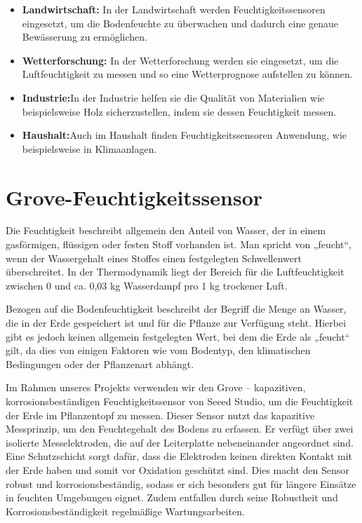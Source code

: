 		\begin{itemize}
			\item \textbf{Landwirtschaft:} In der Landwirtschaft werden Feuchtigkeitssensoren eingesetzt, um die Bodenfeuchte zu überwachen und 
			dadurch eine genaue Bewässerung zu ermöglichen.
			
			\item \textbf{Wetterforschung:}	In der Wetterforschung werden sie eingesetzt, um die Luftfeuchtigkeit zu messen und so eine Wetterprognose aufstellen zu können.  
			
			\item \textbf{Industrie:}In der Industrie helfen sie die Qualität von Materialien wie beispielsweise Holz sicherzustellen, indem sie dessen Feuchtigkeit messen.  
			
			\item \textbf{Haushalt:}Auch im Haushalt finden Feuchtigkeitssensoren Anwendung, wie beispielsweise in Klimaanlagen. 
		\end{itemize}
		
		\vspace{1\baselineskip}
		
		
	\section{Grove-Feuchtigkeitssensor}
		Die Feuchtigkeit beschreibt allgemein den Anteil von Wasser, der in einem gasförmigen, flüssigen oder festen Stoff vorhanden ist. Man spricht von „feucht“, wenn der Wassergehalt eines Stoffes einen festgelegten Schwellenwert überschreitet. In der Thermodynamik liegt der Bereich für die Luftfeuchtigkeit zwischen 0 und ca. 0,03 kg Wasserdampf pro 1 kg trockener Luft.
		\cite{Stephan:2017}
		
		\vspace{1\baselineskip}
		
		Bezogen auf die Bodenfeuchtigkeit beschreibt der Begriff die Menge an Wasser, die in der Erde gespeichert ist und für die Pflanze zur Verfügung steht. Hierbei gibt es jedoch keinen allgemein festgelegten Wert, bei dem die Erde als „feucht“ gilt, da dies von einigen Faktoren wie vom Bodentyp, den klimatischen Bedingungen oder der Pflanzenart abhängt.
		\cite{METER:2023} \cite{Hulatt:2014}
		
		\vspace{1\baselineskip}
		
		Im Rahmen unseres Projekts verwenden wir den Grove – kapazitiven, korrosionsbeständigen Feuchtigkeitssensor von Seeed Studio, um die Feuchtigkeit der Erde im Pflanzentopf zu messen. Dieser Sensor nutzt das kapazitive Messprinzip, um den Feuchtegehalt des Bodens zu erfassen. Er verfügt über zwei isolierte Messelektroden, die auf der Leiterplatte nebeneinander angeordnet sind.  Eine Schutzschicht sorgt dafür, dass die Elektroden keinen direkten Kontakt mit der Erde haben und somit vor Oxidation geschützt sind. Dies macht den Sensor robust und korrosionsbeständig, sodass er sich besonders gut für längere Einsätze in feuchten Umgebungen eignet. Zudem entfallen durch seine Robustheit und Korrosionsbeständigkeit regelmäßige Wartungsarbeiten. \cite{Hesse:2014} \cite{Farahani:2014}
		
